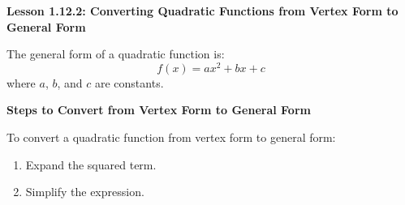\begin{center}
\textbf{Lesson 1.12.2: Converting Quadratic Functions from Vertex Form to General Form}
\end{center}



The general form of a quadratic function is:
\[ f(x) = ax^2 + bx + c \]
where \(a\), \(b\), and \(c\) are constants.

\textbf{Steps to Convert from Vertex Form to General Form}

To convert a quadratic function from vertex form to general form:
\begin{enumerate}[label = \color{blue}\arabic*. ]
    \item Expand the squared term.
    \item Simplify the expression.
\end{enumerate}


